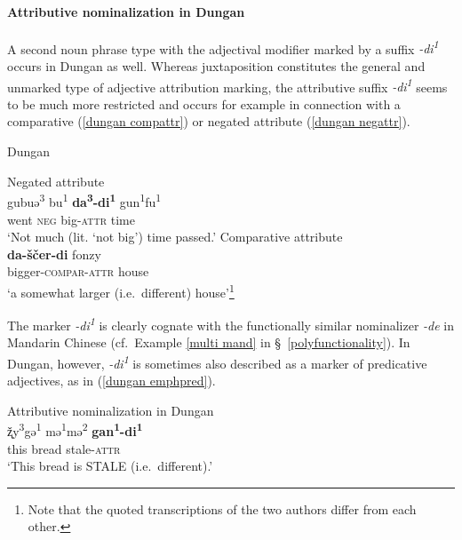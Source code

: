 \paragraph*{Attributive nominalization in Dungan}
A second noun phrase type with the adjectival modifier marked by a suffix \textit{-di\textsuperscript{1}} occurs in Dungan as well. Whereas juxtaposition constitutes the general and unmarked type of adjective attribution marking, the attributive suffix \textit{-di\textsuperscript{1}} seems to be much more restricted and occurs for example in connection with a comparative (\ref{dungan compattr}) or negated attribute (\ref{dungan negattr}).
\begin{exe}
\ex \rm{Dungan}
\begin{xlist}
\ex \rm{Negated attribute \citep[80]{zevachina2001}}\\
\label{dungan negattr}
\gll	gubuə\textsuperscript{3} bu\textsuperscript{1} \textbf{da\textsuperscript{3}-di\textsuperscript{1}} gun\textsuperscript{1}fu\textsuperscript{1}\\
	went \textsc{neg} big-\textsc{attr} time\\
\glt	‘Not much (lit. ‘not big’) time passed.’
\ex \rm{Comparative attribute \citep[480]{kalimov1968}}\\
\label{dungan compattr}
\gll	\textbf{da-ščer-di} fonzy\\
	bigger-\textsc{compar}-\textsc{attr} house\\
\glt	‘a somewhat larger (i.e.~different) house’\footnote{Note that the quoted transcriptions of the two authors differ from each other.}
\end{xlist}
\end{exe}	
The marker \textit{-di\textsuperscript{1}} is clearly cognate with the functionally similar nominalizer \textit{-de} in Mandarin Chinese (cf.~Example \ref{multi mand} in \S~\ref{polyfunctionality}). In Dungan, however, \textit{-di\textsuperscript{1}} is sometimes also described as a marker of predicative adjectives, as in (\ref{dungan emphpred}).
\begin{exe}
\ex \rm{Attributive nominalization in Dungan \citep[82]{zevachina2001}}\\
\label{dungan emphpred}
\gll	ž̨y\textsuperscript{3}gə\textsuperscript{1} mə\textsuperscript{1}mə\textsuperscript{2} \textbf{gan\textsuperscript{1}-di\textsuperscript{1}}\\
	this bread stale-\textsc{attr}\\
\glt	‘This bread is STALE (i.e.~different).’
\end{exe}
